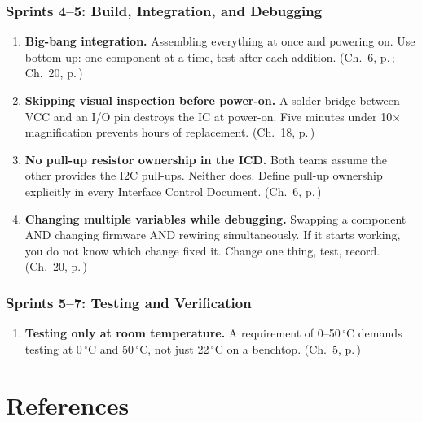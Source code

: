 \documentclass[11pt,letterpaper,twoside,openany]{book}
\newcommand{\degC}{\ensuremath{{}^{\circ}\text{C}}}
\begin{document}
\subsection*{Sprints 4--5: Build, Integration, and Debugging}

\begin{enumerate}[leftmargin=1.5em,resume]

\item \textbf{Big-bang integration.} Assembling everything at once and powering on. Use bottom-up: one component at a time, test after each addition. (Ch.~6, p.\,\pageref{ch:integration}; Ch.~20, p.\,\pageref{ch:debug})

\item \textbf{Skipping visual inspection before power-on.} A solder bridge between VCC and an I/O pin destroys the IC at power-on. Five minutes under 10$\times$ magnification prevents hours of replacement. (Ch.~18, p.\,\pageref{ch:pcb})

\item \textbf{No pull-up resistor ownership in the ICD.} Both teams assume the other provides the I2C pull-ups. Neither does. Define pull-up ownership explicitly in every Interface Control Document. (Ch.~6, p.\,\pageref{ch:integration})

\item \textbf{Changing multiple variables while debugging.} Swapping a component AND changing firmware AND rewiring simultaneously. If it starts working, you do not know which change fixed it. Change one thing, test, record. (Ch.~20, p.\,\pageref{ch:debug})

\end{enumerate}

\subsection*{Sprints 5--7: Testing and Verification}

\begin{enumerate}[leftmargin=1.5em,resume]

\item \textbf{Testing only at room temperature.} A requirement of 0--50\,\degC{} demands testing at 0\,\degC{} and 50\,\degC{}, not just 22\,\degC{} on a benchtop. (Ch.~5, p.\,\pageref{ch:vv})

\end{enumerate}

\chapter*{References}
\end{document}
